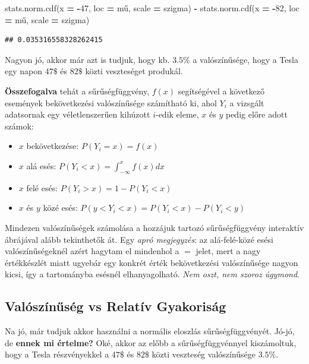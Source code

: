 \documentclass[
]{book}
\newenvironment{Shaded}{\begin{snugshade}}{\end{snugshade}}
\newcommand{\DecValTok}[1]{\textcolor[rgb]{0.00,0.00,0.81}{#1}}
\newcommand{\NormalTok}[1]{#1}
\newcommand{\OperatorTok}[1]{\textcolor[rgb]{0.81,0.36,0.00}{\textbf{#1}}}
\providecommand{\tightlist}{%
  \setlength{\itemsep}{0pt}\setlength{\parskip}{0pt}}
\begin{document}
\begin{Shaded}
\begin{Highlighting}[]
\NormalTok{stats.norm.cdf(x }\OperatorTok{=} \OperatorTok{{-}}\DecValTok{47}\NormalTok{, loc }\OperatorTok{=}\NormalTok{ mű, scale }\OperatorTok{=}\NormalTok{ szigma) }\OperatorTok{{-}}\NormalTok{ stats.norm.cdf(x }\OperatorTok{=} \OperatorTok{{-}}\DecValTok{82}\NormalTok{, loc }\OperatorTok{=}\NormalTok{ mű, scale }\OperatorTok{=}\NormalTok{ szigma)}
\end{Highlighting}
\end{Shaded}

\begin{verbatim}
## 0.035316558328262415
\end{verbatim}

Nagyon jó, akkor már azt is tudjuk, hogy kb. \(3.5\%\) a valószínűsége, hogy a Tesla egy napon \(47\$\) és \(82\$\) közti veszteséget produkál.

\textbf{Összefogalva} tehát a sűrűségfüggvény, \(f(x)\) segítségével a következő események bekövetkezési valószínűsége számítható ki, ahol \(Y_i\) a vizsgált adatsornak egy véletlenszerűen kihúzott \(i\)-edik eleme, \(x\) és \(y\) pedig előre adott számok:

\begin{itemize}
\tightlist
\item
  \(x\) bekövetkezése: \(P(Y_i=x)=f(x)\)
\item
  \(x\) alá esés: \(P(Y_i<x)=\int_{-\infty}^x{f(x)}dx\)
\item
  \(x\) felé esés: \(P(Y_i>x)=1-P(Y_i<x)\)
\item
  \(x\) és \(y\) közé esés: \(P(y<Y_i<x)=P(Y_i<x)-P(Y_i<y)\)
\end{itemize}

Mindezen valószínűségek számolása a hozzájuk tartozó sűrűségfüggvény interaktív ábrájával alább tekinthetők át.
Egy \emph{apró megjegyzés}: az alá-felé-közé esési valószínűségeknél azért hagytam el mindenhol a \(=\) jelet, mert a nagy értékkészlét miatt ugyebár egy konkrét érték bekövetkezési valószínűsége nagyon kicsi, így a tartományba esésnél elhanyagolható. \emph{Nem oszt, nem szoroz úgymond}.

\subsection{Valószínűség vs Relatív Gyakoriság}\label{valuxf3szuxednux171suxe9g-vs-relatuxedv-gyakorisuxe1g}

Na jó, már tudjuk akkor használni a normális eloszlás sűrűségfüggvényét. Jó-jó, de \textbf{ennek mi értelme?} Oké, akkor az előbb a sűrűségfüggvénnyel kiszámoltuk, hogy a Tesla részvényekkel a \(47\$\) és \(82\$\) közti veszteség valószínűsége \(3.5\%\).
\end{document}
